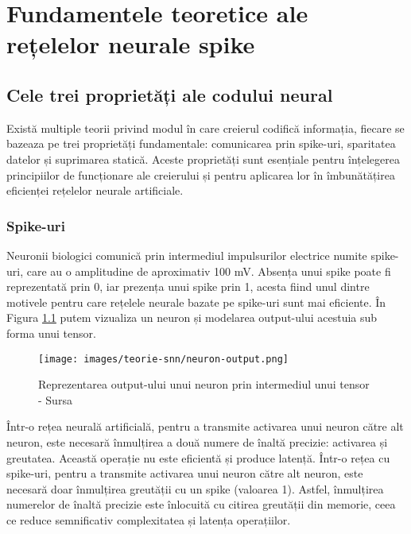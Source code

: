 \chapter{Fundamentele teoretice ale rețelelor neurale spike}

\section{Cele trei proprietăți ale codului neural}

Există multiple teorii privind modul în care creierul 
codifică informația, fiecare se bazeaza pe trei  
proprietăți fundamentale: comunicarea prin spike-uri, 
sparitatea datelor și suprimarea 
statică. Aceste 
proprietăți sunt esențiale pentru înțelegerea principiilor de funcționare ale 
creierului și pentru 
aplicarea lor în îmbunătățirea eficienței rețelelor neurale artificiale.

\subsection{Spike-uri}

Neuronii biologici comunică prin intermediul impulsurilor electrice numite spike-uri, care au o amplitudine de aproximativ 100 mV. Absența unui spike poate fi reprezentată prin 0, iar prezența unui spike prin 1, acesta fiind unul dintre motivele pentru care rețelele neurale bazate pe spike-uri sunt mai eficiente. În Figura \ref{fig:neuronOutput} putem vizualiza un neuron și modelarea output-ului acestuia sub forma unui tensor.

\begin{figure}
    \centering
    \texttt{[image: images/teorie-snn/neuron-output.png]}
    \caption{Reprezentarea output-ului unui neuron prin intermediul unui tensor - Sursa \cite{neuronOutput}}
    \label{fig:neuronOutput}
\end{figure}

Într-o rețea neurală artificială, pentru a transmite activarea unui neuron către alt neuron, este necesară înmulțirea a două numere de înaltă precizie: activarea și greutatea. Această operație nu este eficientă și produce latență. Într-o rețea cu spike-uri, pentru a transmite activarea unui neuron către alt neuron, este necesară doar înmulțirea greutății cu un spike (valoarea 1). Astfel, înmulțirea numerelor de înaltă precizie este înlocuită cu citirea greutății din memorie, ceea ce reduce semnificativ complexitatea și latența operațiilor.


